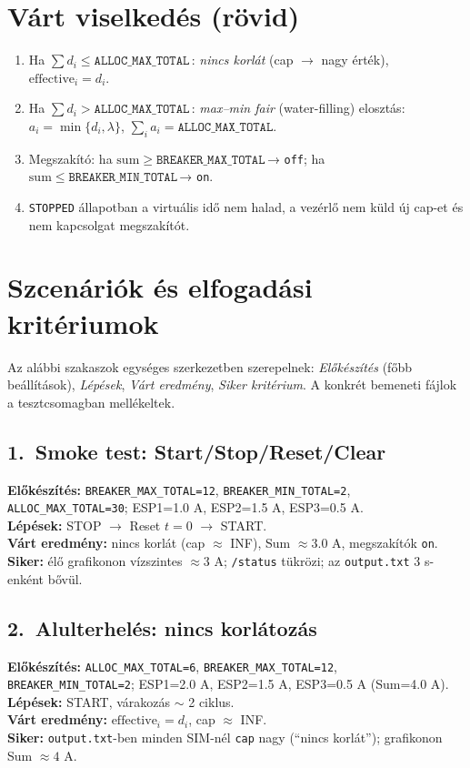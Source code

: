 \section{Várt viselkedés (rövid)}
\begin{enumerate}
  \item Ha \(\sum d_i \le \texttt{ALLOC\_MAX\_TOTAL}\)\,: \emph{nincs korlát} (cap \(\to\) nagy érték), \(\mathrm{effective}_i=d_i\).
  \item Ha \(\sum d_i > \texttt{ALLOC\_MAX\_TOTAL}\)\,: \emph{max--min fair} (water-filling) elosztás: \(a_i=\min\{d_i,\lambda\}\), \(\sum_i a_i = \texttt{ALLOC\_MAX\_TOTAL}\).
  \item Megszakító: ha \(\mathrm{sum} \ge \texttt{BREAKER\_MAX\_TOTAL}\)\,→ \texttt{off}; ha \(\mathrm{sum} \le \texttt{BREAKER\_MIN\_TOTAL}\)\,→ \texttt{on}.
  \item \texttt{STOPPED} állapotban a virtuális idő nem halad, a vezérlő nem küld új cap-et és nem kapcsolgat megszakítót.
\end{enumerate}

\section{Szcenáriók és elfogadási kritériumok}
Az alábbi szakaszok egységes szerkezetben szerepelnek: \emph{Előkészítés} (főbb beállítások), \emph{Lépések}, \emph{Várt eredmény}, \emph{Siker kritérium}. A konkrét bemeneti fájlok a tesztcsomagban mellékeltek.

\subsection{1.\ Smoke test: Start/Stop/Reset/Clear}
\textbf{Előkészítés:} \texttt{BREAKER\_MAX\_TOTAL=12}, \texttt{BREAKER\_MIN\_TOTAL=2}, \texttt{ALLOC\_MAX\_TOTAL=30}; ESP1=1.0 A, ESP2=1.5 A, ESP3=0.5 A.\\
\textbf{Lépések:} STOP \(\to\) Reset \(t{=}0\) \(\to\) START.\\
\textbf{Várt eredmény:} nincs korlát (cap \(\approx\) INF), Sum \(\approx 3.0\) A, megszakítók \texttt{on}.\\
\textbf{Siker:} élő grafikonon vízszintes \(\approx 3\) A; \texttt{/status} tükrözi; az \texttt{output.txt} 3 s-enként bővül.

\subsection{2.\ Alulterhelés: nincs korlátozás}
\textbf{Előkészítés:} \texttt{ALLOC\_MAX\_TOTAL=6}, \texttt{BREAKER\_MAX\_TOTAL=12}, \texttt{BREAKER\_MIN\_TOTAL=2}; ESP1=2.0 A, ESP2=1.5 A, ESP3=0.5 A (Sum=4.0 A).\\
\textbf{Lépések:} START, várakozás \(\sim\) 2 ciklus.\\
\textbf{Várt eredmény:} \(\mathrm{effective}_i = d_i\), cap \(\approx\) INF.\\
\textbf{Siker:} \texttt{output.txt}-ben minden SIM-nél \texttt{cap} nagy (``nincs korlát''); grafikonon Sum \(\approx 4\) A.

